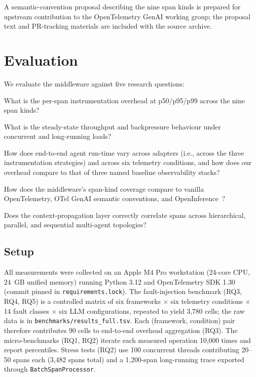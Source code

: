 \documentclass[sigconf,review,anonymous,9pt]{acmart}
\begin{document}
A semantic-convention proposal describing the nine span kinds is
prepared for upstream contribution to the OpenTelemetry GenAI
working group; the proposal text and PR-tracking materials are
included with the source archive.

\section{Evaluation}
\label{sec:eval}

We evaluate the middleware against five research questions:

\begin{description}[leftmargin=*,nosep,style=nextline]
  \item[RQ1] What is the per-span instrumentation overhead at
    p50/p95/p99 across the nine span kinds?
  \item[RQ2] What is the steady-state throughput and backpressure
    behaviour under concurrent and long-running loads?
  \item[RQ3] How does end-to-end agent run-time vary across adapters
    (i.e., across the three instrumentation strategies) and across
    six telemetry conditions, and how does our overhead compare to
    that of three named baseline observability stacks?
  \item[RQ4] How does the middleware's span-kind coverage compare to
    vanilla OpenTelemetry, OTel GenAI semantic conventions, and
    OpenInference~\cite{openinference}?
  \item[RQ5] Does the context-propagation layer correctly correlate
    spans across hierarchical, parallel, and sequential multi-agent
    topologies?
\end{description}

\subsection{Setup}

All measurements were collected on an Apple M4 Pro workstation
(24-core CPU, 24~GB unified memory) running Python 3.12 and
OpenTelemetry SDK 1.30 (commit pinned in
\texttt{requirements.lock}). The fault-injection benchmark
(RQ3, RQ4, RQ5) is a controlled matrix of six frameworks $\times$ six
telemetry conditions $\times$ 14 fault classes $\times$ six LLM
configurations, repeated to yield 3{,}780 cells; the raw data is in
\texttt{benchmarks/results\_full.tsv}. Each (framework, condition)
pair therefore contributes 90 cells to end-to-end overhead
aggregation (RQ3). The micro-benchmarks (RQ1, RQ2) iterate each
measured operation 10{,}000 times and report percentiles. Stress
tests (RQ2) use 100 concurrent threads contributing 20--50 spans each
(3{,}482 spans total) and a 1{,}200-span long-running trace exported
through \texttt{BatchSpanProcessor}.
\end{document}
